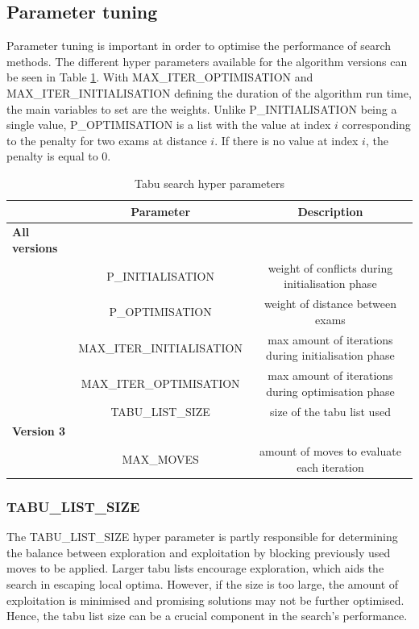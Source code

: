 \subsection{Parameter tuning} \label{tuning}

Parameter tuning is important in order to optimise the performance of search methods. The different hyper parameters  available for the algorithm versions can be seen in Table \ref{tab:possible_parameters}. With MAX\_ITER\_OPTIMISATION and MAX\_ITER\_INITIALISATION defining the duration of the algorithm run time, the main variables to set are the weights. Unlike P\_INITIALISATION being a single value, P\_OPTIMISATION is a list with the value at index $i$ corresponding to the penalty for two exams at distance $i$. If there is no value at index $i$, the penalty is equal to 0.

\begin{table}[h]
	\caption{Tabu search hyper parameters}
	\label{tab:possible_parameters}
	\centering
	\begin{tabular}{l c c}
		\hline
		& \textbf{Parameter} & \textbf{Description}  \\ \hline
        \textbf{All versions} & &\\ 
		& P\_INITIALISATION & weight of conflicts during initialisation phase \\
        & P\_OPTIMISATION  & weight of distance between exams\\
	    & MAX\_ITER\_INITIALISATION & max amount of iterations during initialisation phase \\
        & MAX\_ITER\_OPTIMISATION & max amount of iterations during optimisation phase\\ 
        & TABU\_LIST\_SIZE & size of the tabu list used\\
        \textbf{Version 3} & &\\ 
        & MAX\_MOVES & amount of moves to evaluate each iteration \\ 
        \hline
	\end{tabular}
\end{table}





\subsubsection{TABU\_LIST\_SIZE }

The TABU\_LIST\_SIZE hyper parameter is partly responsible for determining the balance between exploration and exploitation by blocking previously used moves to be applied. Larger tabu lists encourage exploration, which aids the search in escaping local optima. However, if the size is too large, the amount of exploitation is minimised and promising solutions may not be further optimised. Hence, the tabu list size can be a crucial component in the search's performance.

